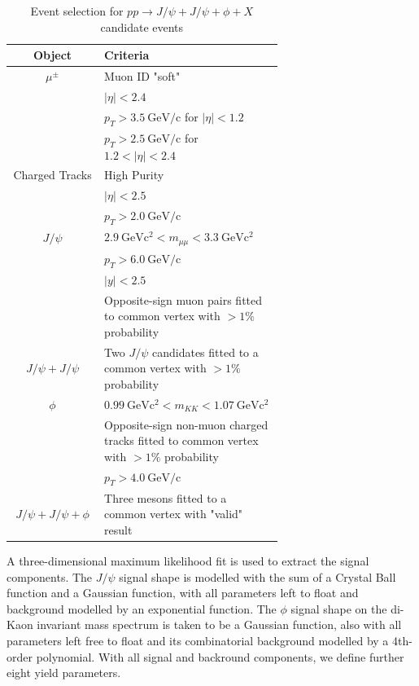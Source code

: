 \documentclass[10pt,twocolumn]{article}
\newcommand*{\GeVc}{~\text{GeV/c}}
\newcommand*{\GeVcs}{~\text{GeV}\text{c}^2}
\begin{document}
\begin{table}[h!]
    \centering
    \caption{Event selection for \texorpdfstring{$pp\to J/\psi+J/\psi+\phi+X$}{pp -> J/psi + J/psi + phi} candidate events\\}
    \begin{tabular}{c p{0.66\linewidth}}
        \toprule
        \textbf{Object} & \textbf{Criteria} \\
        \midrule
        $\mu^\pm $ & Muon ID "soft" \\
                  & $|\eta| < 2.4$ \\
                  & $p_T > 3.5\GeVc$ for $|\eta| < 1.2$ \\
                  & $p_T > 2.5\GeVc$ for $1.2 < |\eta| < 2.4$ \\
                  \midrule
        Charged Tracks & High Purity \\
                  & $|\eta|<2.5$ \\
                  & $p_T > 2.0 \GeVc$ \\
        \midrule
        $J/\psi$ & $2.9 \GeVcs < m_{\mu\mu} < 3.3 \GeVcs$ \\
                 & $p_T > 6.0\GeVc$ \\
                 & $|y| < 2.5$ \\
                 & Opposite-sign muon pairs fitted to common vertex with $> 1\%$ probability \\
                 \midrule
        $J/\psi+J/\psi$ & Two $J/\psi$ candidates fitted to a common vertex with $> 1\%$ probability \\
        \midrule
        $\phi$ & $0.99 \GeVcs < m_{KK} < 1.07 \GeVcs$ \\
               & Opposite-sign non-muon charged tracks fitted to common vertex with $> 1\%$ probability \\
               & $p_T > 4.0\GeVc$ \\
               \midrule
        $J/\psi+J/\psi+\phi$ & Three mesons fitted to a common vertex with "valid" result \\
        \bottomrule
    \end{tabular}
    \label{tab:cut_JpsiJpsiPhi}
\end{table}

A three-dimensional maximum likelihood fit is used to extract the signal components. The $J/\psi$ signal shape is modelled with the sum of a Crystal Ball function and a Gaussian function, with all parameters left to float and background modelled by an exponential function. The $\phi$ signal shape on the di-Kaon invariant mass spectrum is taken to be a Gaussian function, also with all parameters left free to float and its combinatorial background modelled by a 4th-order polynomial. With all signal and backround components, we define further eight yield parameters.
\end{document}
